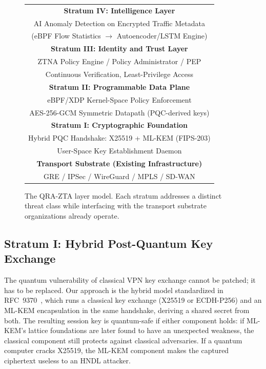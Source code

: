 \documentclass[conference]{IEEEtran}
\begin{document}
\begin{figure}[htbp]
\centering
\begin{tabular}{|c|}
\hline
\textbf{Stratum IV: Intelligence Layer} \\
AI Anomaly Detection on Encrypted Traffic Metadata \\
(eBPF Flow Statistics $\rightarrow$ Autoencoder/LSTM Engine) \\
\hline
\textbf{Stratum III: Identity and Trust Layer} \\
ZTNA Policy Engine / Policy Administrator / PEP \\
Continuous Verification, Least-Privilege Access \\
\hline
\textbf{Stratum II: Programmable Data Plane} \\
eBPF/XDP Kernel-Space Policy Enforcement \\
AES-256-GCM Symmetric Datapath (PQC-derived keys) \\
\hline
\textbf{Stratum I: Cryptographic Foundation} \\
Hybrid PQC Handshake: X25519 + ML-KEM (FIPS-203) \\
User-Space Key Establishment Daemon \\
\hline
\textbf{Transport Substrate (Existing Infrastructure)} \\
GRE / IPSec / WireGuard / MPLS / SD-WAN \\
\hline
\end{tabular}
\caption{The QRA-ZTA layer model. Each stratum addresses a
distinct threat class while interfacing with the transport
substrate organizations already operate.}
\label{fig:qrazta}
\end{figure}

\subsection{Stratum I: Hybrid Post-Quantum Key Exchange}

The quantum vulnerability of classical VPN key exchange cannot
be patched; it has to be replaced. Our approach is the hybrid
model standardized in RFC~9370~\cite{rfc9370}, which runs a
classical key exchange (X25519 or ECDH-P256) and an ML-KEM
encapsulation in the same handshake, deriving a shared secret
from both. The resulting session key is quantum-safe if either
component holds: if ML-KEM's lattice foundations are later
found to have an unexpected weakness, the classical component
still protects against classical adversaries. If a quantum
computer cracks X25519, the ML-KEM component makes the
captured ciphertext useless to an HNDL attacker.
\end{document}
